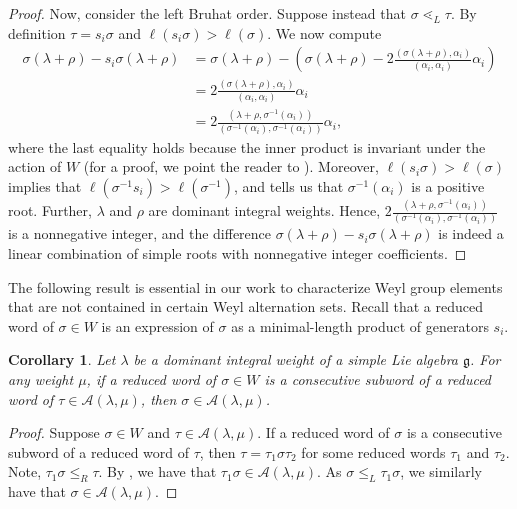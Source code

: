 \documentclass{amsart}
\newtheorem{corollary}[theorem]{Corollary}
\theoremstyle{definition}
\newcommand{\calA}{\mathcal{A}}
\begin{document}
\begin{proof}
Now, consider the left Bruhat order.
Suppose instead that $\sigma\lessdot_L\tau$. 
By definition $\tau=s_i\sigma$ and $\ell(s_i\sigma)>\ell(\sigma)$. 
We now compute
\begin{align*}
        \sigma(\lambda+\rho)-s_i \sigma(\lambda+\rho)&=\sigma(\lambda+\rho)-\left(\sigma(\lambda+\rho)-2\frac{(\sigma(\lambda+\rho), \alpha_i)}{(\alpha_i,\alpha_i)}\alpha_i\right)\\
        &=2\frac{(\sigma(\lambda+\rho), \alpha_i)}{(\alpha_i,\alpha_i)}\alpha_i\\
        &=2\frac{(\lambda+\rho,\sigma^{-1}(\alpha_i))}{(\sigma^{-1}(\alpha_i),\sigma^{-1}(\alpha_i))}\alpha_i,
    \end{align*}
    where the last equality holds because the inner product is invariant under the action of $W$ (for a proof, we point the reader to \cite[Equation 4.23]{bjorner2005combinatorics}).
    Moreover, $\ell(s_i\sigma)>\ell(\sigma)$ implies that $\ell(\sigma^{-1}s_i)>\ell(\sigma^{-1})$, and \cite[Equation 4.25]{bjorner2005combinatorics} tells us that $\sigma^{-1}(\alpha_i)$ is a positive root. Further, $\lambda$ and $\rho$ are dominant integral weights.
    Hence, $2\frac{(\lambda+\rho,\sigma^{-1}(\alpha_i))}{(\sigma^{-1}(\alpha_i),\sigma^{-1}(\alpha_i))}$ is a nonnegative integer, and the difference $\sigma(\lambda+\rho)-s_i\sigma(\lambda+\rho)$ is indeed a linear combination of simple roots with nonnegative integer coefficients.
\end{proof}

The following result is essential in our work to characterize Weyl group elements that are not contained in certain Weyl alternation sets.
Recall that a reduced word of $\sigma \in W$ is an expression of $\sigma$ as a minimal-length product of generators $s_i$.

\begin{corollary} \label{cor:subword_property}
     Let $\lambda$ be a dominant integral weight of a simple Lie algebra $\mathfrak{g}$. For any weight $\mu$, if a reduced word of $\sigma\in W$ is a consecutive subword of a reduced word of $\tau\in \calA(\lambda,\mu)$, then $\sigma\in\calA(\lambda,\mu)$.
\end{corollary}

\begin{proof}
Suppose $\sigma\in W$ and $\tau\in \calA(\lambda,\mu)$. If a reduced word of $\sigma$ is a consecutive subword of a reduced word of $\tau$, then $\tau=\tau_1\sigma\tau_2$ for some reduced words $\tau_1$ and $\tau_2$. Note, $\tau_1\sigma\leq_R \tau$. 
By , we have that $\tau_1\sigma\in\calA(\lambda,\mu)$. As $\sigma\leq_L \tau_1\sigma$, we similarly have that $\sigma\in\calA(\lambda,\mu)$.
\end{proof}
\end{document}
